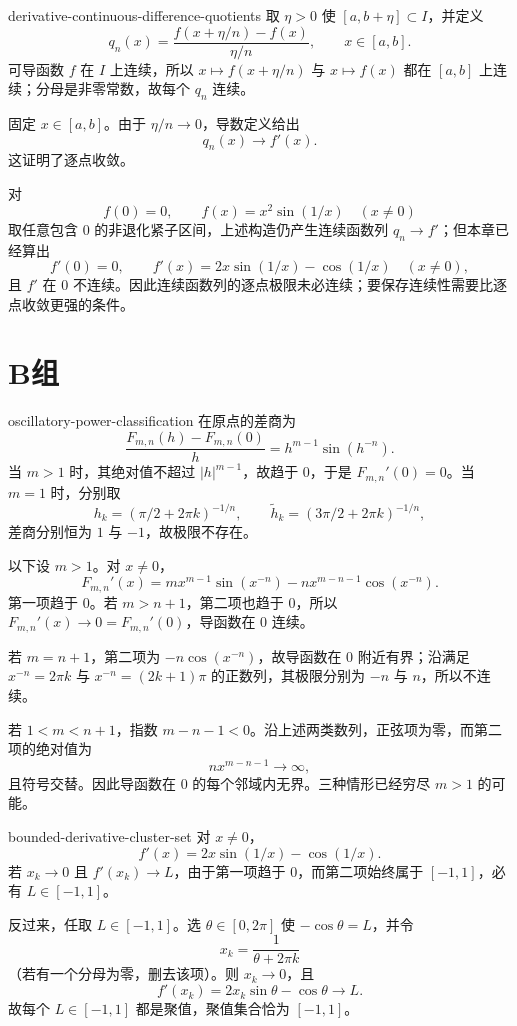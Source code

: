\begin{solution}{derivative-continuous-difference-quotients}
取 \(\eta>0\) 使 \([a,b+\eta]\subset I\)，并定义
\[
 q_n(x)=\frac{f(x+\eta/n)-f(x)}{\eta/n},
 \qquad x\in[a,b].
\]
可导函数 \(f\) 在 \(I\) 上连续，所以 \(x\mapsto f(x+\eta/n)\) 与 \(x\mapsto f(x)\) 都在 \([a,b]\) 上连续；分母是非零常数，故每个 \(q_n\) 连续。

固定 \(x\in[a,b]\)。由于 \(\eta/n\to0\)，导数定义给出
\[
 q_n(x)\longrightarrow f'(x).
\]
这证明了逐点收敛。

对
\[
 f(0)=0,\qquad f(x)=x^2\sin(1/x)\quad(x\ne0)
\]
取任意包含 \(0\) 的非退化紧子区间，上述构造仍产生连续函数列 \(q_n\to f'\)；但本章已经算出
\[
 f'(0)=0,\qquad
 f'(x)=2x\sin(1/x)-\cos(1/x)\quad(x\ne0),
\]
且 \(f'\) 在 \(0\) 不连续。因此连续函数列的逐点极限未必连续；要保存连续性需要比逐点收敛更强的条件。
\end{solution}

\section*{B组}

\begin{solution}{oscillatory-power-classification}
在原点的差商为
\[
 \frac{F_{m,n}(h)-F_{m,n}(0)}h
 =h^{m-1}\sin(h^{-n}).
\]
当 \(m>1\) 时，其绝对值不超过 \(|h|^{m-1}\)，故趋于 \(0\)，于是 \(F_{m,n}'(0)=0\)。当 \(m=1\) 时，分别取
\[
 h_k=(\pi/2+2\pi k)^{-1/n},
 \qquad
 \widetilde h_k=(3\pi/2+2\pi k)^{-1/n},
\]
差商分别恒为 \(1\) 与 \(-1\)，故极限不存在。

以下设 \(m>1\)。对 \(x\ne0\)，
\[
 F_{m,n}'(x)
 =m x^{m-1}\sin(x^{-n})
 -n x^{m-n-1}\cos(x^{-n}).
\]
第一项趋于 \(0\)。若 \(m>n+1\)，第二项也趋于 \(0\)，所以 \(F_{m,n}'(x)\to0=F_{m,n}'(0)\)，导函数在 \(0\) 连续。

若 \(m=n+1\)，第二项为 \(-n\cos(x^{-n})\)，故导函数在 \(0\) 附近有界；沿满足 \(x^{-n}=2\pi k\) 与 \(x^{-n}=(2k+1)\pi\) 的正数列，其极限分别为 \(-n\) 与 \(n\)，所以不连续。

若 \(1<m<n+1\)，指数 \(m-n-1<0\)。沿上述两类数列，正弦项为零，而第二项的绝对值为
\[
 n x^{m-n-1}\longrightarrow\infty,
\]
且符号交替。因此导函数在 \(0\) 的每个邻域内无界。三种情形已经穷尽 \(m>1\) 的可能。
\end{solution}

\begin{solution}{bounded-derivative-cluster-set}
对 \(x\ne0\)，
\[
 f'(x)=2x\sin(1/x)-\cos(1/x).
\]
若 \(x_k\to0\) 且 \(f'(x_k)\to L\)，由于第一项趋于 \(0\)，而第二项始终属于 \([-1,1]\)，必有 \(L\in[-1,1]\)。

反过来，任取 \(L\in[-1,1]\)。选 \(\theta\in[0,2\pi]\) 使 \(-\cos\theta=L\)，并令
\[
 x_k=\frac1{\theta+2\pi k}
\]
（若有一个分母为零，删去该项）。则 \(x_k\to0\)，且
\[
 f'(x_k)
 =2x_k\sin\theta-\cos\theta
 \longrightarrow L.
\]
故每个 \(L\in[-1,1]\) 都是聚值，聚值集合恰为 \([-1,1]\)。
\end{solution}

